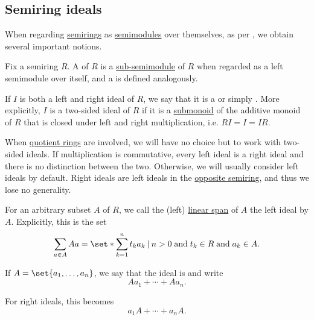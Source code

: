 \subsection{Semiring ideals}\label{subsec:semiring_ideals}

When regarding \hyperref[def:semiring]{semirings} as \hyperref[def:semimodule]{semimodules} over themselves, as per , we obtain several important notions.

\begin{definition}\label{def:semiring_ideal}\mimprovised
  Fix a semiring \( R \). A  of \( R \) is a \hyperref[def:semimodule/submodel]{sub-semimodule} of \( R \) when regarded as a left semimodule over itself, and a  is defined analogously.

  If \( I \) is both a left and right ideal of \( R \), we say that it is a  or simply . More explicitly, \( I \) is a two-sided ideal of \( R \) if it is a \hyperref[def:monoid/submodel]{submonoid} of the additive monoid of \( R \) that is closed under left and right multiplication, i.e. \( RI = I = IR \).

  When \hyperref[def:ring/quotient]{quotient rings} are involved, we will have no choice but to work with two-sided ideals. If multiplication is commutative, every left ideal is a right ideal and there is no distinction between the two. Otherwise, we will usually consider left ideals by default. Right ideals are left ideals in the \hyperref[def:semiring/opposite]{opposite semiring}, and thus we lose no generality.

  \begin{thmenum}
     For an arbitrary subset \( A \) of \( R \), we call the (left) \hyperref[def:semimodule/submodel]{linear span} of \( A \) the left ideal  by \( A \). Explicitly, this is the set
    \begin{equation*}
      \sum_{a \in A} A a = \set*{ \sum_{k=1}^n t_k a_k \given n > 0 \T{and} t_k \in R \T{and} a_k \in A }.
    \end{equation*}

    If \( A = \set{ a_1, \ldots, a_n } \), we say that the ideal is  and write
    \begin{equation*}
      A a_1 + \cdots + A a_n.
    \end{equation*}

    For right ideals, this becomes
    \begin{equation*}
      a_1 A + \cdots + a_n A.
    \end{equation*}


\end{thmenum}
\end{definition}
